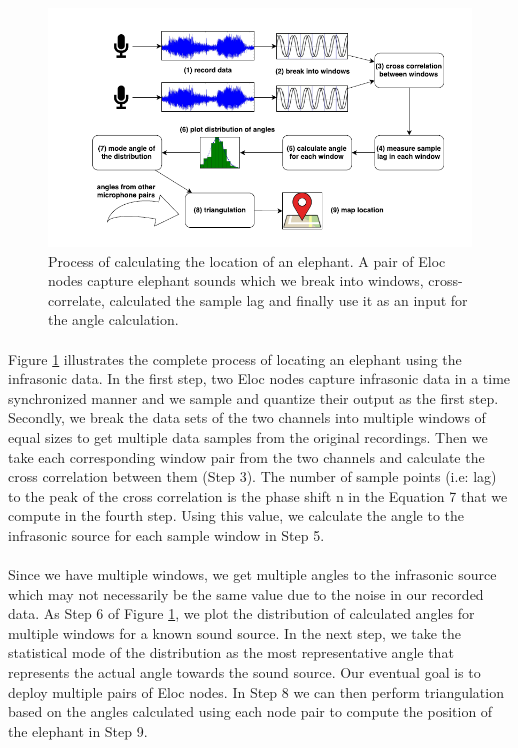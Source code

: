 \documentclass[12pt]{article}
\numberwithin{figure}{section}
\numberwithin{table}{section}
\begin{document}
\begin{figure}[H]
\centering
\includegraphics[width= \textwidth]{crosscor_implementation.png}
\caption[Process of calculating the location of an elephan]{Process of calculating the location of an elephant.
A pair of Eloc nodes capture elephant sounds which we
break into windows, cross-correlate, calculated the sample
lag and finally use it as an input for the angle calculation.}
\label{crosscor_implementation}
\end{figure}

\paragraph{}
Figure \ref{crosscor_implementation} illustrates the complete process of locating an elephant using the infrasonic data. In the first step, two Eloc nodes capture infrasonic data in a time synchronized manner and we sample and quantize their output as the first step. Secondly, we break the data sets of the two channels into multiple windows of equal sizes to get multiple data samples from the original recordings. Then we take each corresponding window pair from the two channels and calculate
the cross correlation between them (Step 3). The number of sample points (i.e: lag) to the peak of the cross correlation
is the phase shift n in the Equation 7 that we compute in the fourth step. Using this value, we calculate the angle to the
infrasonic source for each sample window in Step 5.

\paragraph{}
Since we have multiple windows, we get multiple angles to the infrasonic source which may not necessarily be the
same value due to the noise in our recorded data. As Step 6 of Figure \ref{crosscor_implementation}, we plot the distribution of calculated angles for multiple windows for a known sound source. In the next step, we take the statistical mode of the distribution as the most representative angle that represents the actual angle towards the sound source. Our eventual goal is to deploy multiple pairs of Eloc nodes. In Step 8 we can then perform triangulation based on the angles calculated using each node pair to compute the position of the elephant in Step 9.
\end{document}
